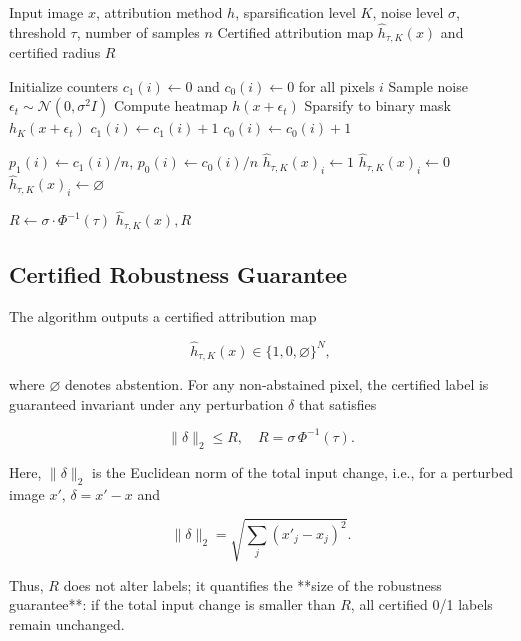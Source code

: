 \documentclass[11pt]{article}
\begin{document}
\begin{algorithm}[H]
\caption{Pixel-level Certified Attribution}
\label{alg:pixel_cert}
\begin{algorithmic}[1]
\REQUIRE Input image $x$, attribution method $h$, sparsification level $K$, noise level $\sigma$, threshold $\tau$, number of samples $n$
\ENSURE Certified attribution map $\hat{h}_{\tau,K}(x)$ and certified radius $R$

\STATE Initialize counters $c_1(i) \gets 0$ and $c_0(i) \gets 0$ for all pixels $i$
  \STATE Sample noise $\epsilon_t \sim \mathcal{N}(0,\sigma^2 I)$
  \STATE Compute heatmap $h(x+\epsilon_t)$
  \STATE Sparsify to binary mask $h_K(x+\epsilon_t)$
      \STATE $c_1(i) \gets c_1(i) + 1$
    \ELSE
      \STATE $c_0(i) \gets c_0(i) + 1$
    \ENDIF
  \ENDFOR
\ENDFOR

  \STATE $p_1(i) \gets c_1(i)/n$, \quad $p_0(i) \gets c_0(i)/n$
    \STATE $\hat{h}_{\tau,K}(x)_i \gets 1$
    \STATE $\hat{h}_{\tau,K}(x)_i \gets 0$
  \ELSE
    \STATE $\hat{h}_{\tau,K}(x)_i \gets \varnothing$
  \ENDIF
\ENDFOR

\STATE $R \gets \sigma \cdot \Phi^{-1}(\tau)$
\RETURN $\hat{h}_{\tau,K}(x), R$
\end{algorithmic}
\end{algorithm}


\subsection{Certified Robustness Guarantee}
The algorithm outputs a certified attribution map

$$
\hat{h}_{\tau,K}(x) \in \{1,0,\varnothing\}^N,
$$

where $\varnothing$ denotes abstention. For any non‑abstained pixel, the certified label is guaranteed invariant under any perturbation $\delta$ that satisfies

$$
\|\delta\|_2 \le R,\quad R = \sigma\,\Phi^{-1}(\tau).
$$

Here, $\|\delta\|_2$ is the Euclidean norm of the total input change, i.e., for a perturbed image $x'$, $\delta=x'-x$ and

$$
\|\delta\|_2 = \sqrt{\sum_j (x'_j - x_j)^2}.
$$

Thus, $R$ does not alter labels; it quantifies the **size of the robustness guarantee**: if the total input change is smaller than $R$, all certified 0/1 labels remain unchanged.
\end{document}
